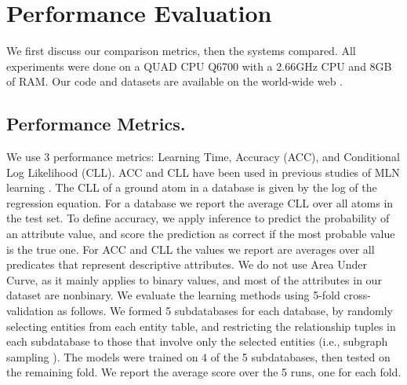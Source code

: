 \documentclass[twoside,leqno,twocolumn]{article}
\begin{document}
\section{Performance Evaluation}

We first discuss our comparison metrics, then the systems compared. All experiments were done on a QUAD CPU Q6700 with a 2.66GHz CPU and 8GB of RAM. Our code and datasets are available on the world-wide web \cite{bib:jbnsite}. 


\subsection{Performance Metrics.}
We use 3 performance metrics: %
Learning Time, Accuracy (ACC), and Conditional Log Likelihood (CLL). ACC and CLL have been used in previous studies of MLN learning  \cite{Domingos2007,Schulte2012}. The CLL of a ground atom in a database is given by the log of the regression equation. For a database we report the average CLL over all atoms in the test set. To define accuracy, we apply inference to predict the probability of an attribute value, and score the prediction as correct if the most probable value is the true one. For ACC and CLL the values we report are averages over all predicates that represent descriptive attributes.
We do not use Area Under Curve, as it mainly applies to binary values, and most of the attributes in our dataset are nonbinary. 
We evaluate the learning methods using 5-fold cross-validation as follows. We formed 5 subdatabases for each database, by randomly selecting entities from each entity table, and restricting the relationship tuples in each subdatabase to those that involve only the selected entities  (i.e., subgraph sampling \cite{Frank1977,Schulte2012}). The models were trained on 4 of the 5 subdatabases, then tested on the remaining fold. We report the  average score over the 5 runs, one for each fold. 
\end{document}
